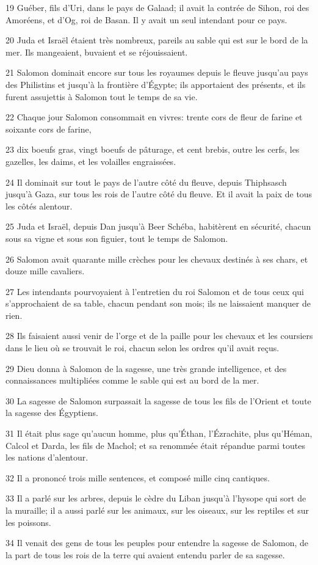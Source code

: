 \par 19 Guéber, fils d'Uri, dans le pays de Galaad; il avait la contrée de Sihon, roi des Amoréens, et d'Og, roi de Basan. Il y avait un seul intendant pour ce pays.
\par 20 Juda et Israël étaient très nombreux, pareils au sable qui est sur le bord de la mer. Ils mangeaient, buvaient et se réjouissaient.
\par 21 Salomon dominait encore sur tous les royaumes depuis le fleuve jusqu'au pays des Philistins et jusqu'à la frontière d'Égypte; ils apportaient des présents, et ils furent assujettis à Salomon tout le temps de sa vie.
\par 22 Chaque jour Salomon consommait en vivres: trente cors de fleur de farine et soixante cors de farine,
\par 23 dix boeufs gras, vingt boeufs de pâturage, et cent brebis, outre les cerfs, les gazelles, les daims, et les volailles engraissées.
\par 24 Il dominait sur tout le pays de l'autre côté du fleuve, depuis Thiphsasch jusqu'à Gaza, sur tous les rois de l'autre côté du fleuve. Et il avait la paix de tous les côtés alentour.
\par 25 Juda et Israël, depuis Dan jusqu'à Beer Schéba, habitèrent en sécurité, chacun sous sa vigne et sous son figuier, tout le temps de Salomon.
\par 26 Salomon avait quarante mille crèches pour les chevaux destinés à ses chars, et douze mille cavaliers.
\par 27 Les intendants pourvoyaient à l'entretien du roi Salomon et de tous ceux qui s'approchaient de sa table, chacun pendant son mois; ils ne laissaient manquer de rien.
\par 28 Ils faisaient aussi venir de l'orge et de la paille pour les chevaux et les coursiers dans le lieu où se trouvait le roi, chacun selon les ordres qu'il avait reçus.
\par 29 Dieu donna à Salomon de la sagesse, une très grande intelligence, et des connaissances multipliées comme le sable qui est au bord de la mer.
\par 30 La sagesse de Salomon surpassait la sagesse de tous les fils de l'Orient et toute la sagesse des Égyptiens.
\par 31 Il était plus sage qu'aucun homme, plus qu'Éthan, l'Ézrachite, plus qu'Héman, Calcol et Darda, les fils de Machol; et sa renommée était répandue parmi toutes les nations d'alentour.
\par 32 Il a prononcé trois mille sentences, et composé mille cinq cantiques.
\par 33 Il a parlé sur les arbres, depuis le cèdre du Liban jusqu'à l'hysope qui sort de la muraille; il a aussi parlé sur les animaux, sur les oiseaux, sur les reptiles et sur les poissons.
\par 34 Il venait des gens de tous les peuples pour entendre la sagesse de Salomon, de la part de tous les rois de la terre qui avaient entendu parler de sa sagesse.

